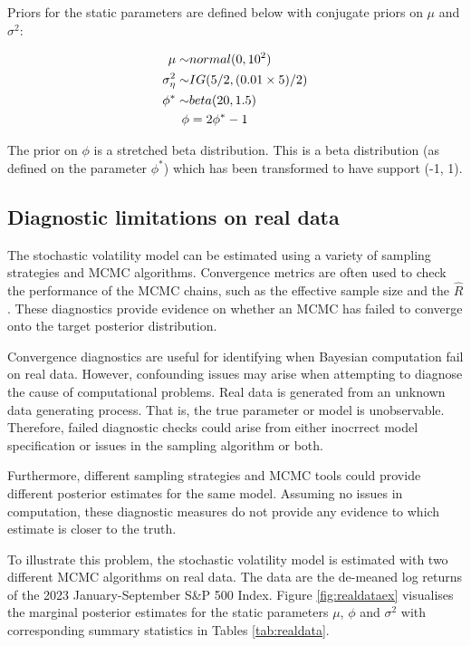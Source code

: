 \documentclass[12pt, a4paper]{article}
\begin{document}
    Priors for the static parameters are defined below with conjugate priors on $\mu$ and $\sigma^2$:

    $$
    \begin{aligned}
    \mu \sim& \space normal(0, 10^2) \\
    \sigma_{\eta}^2 \sim& \space IG(5/2, (0.01\times 5) / 2) \\
    \phi^{\ast} \sim& \space beta(20, 1.5) \\
    \phi &=  2\phi^{\ast} - 1
    \end{aligned}
    $$

    The prior on $\phi$ is a stretched beta distribution. This is a beta distribution (as defined on the parameter $\phi^*$) which has been transformed to have support (-1, 1).


\subsection{Diagnostic limitations on real data}
    The stochastic volatility model can be estimated using a variety of sampling strategies and MCMC algorithms. Convergence metrics are often used to check the performance of the MCMC chains, such as the effective sample size and the $\hat{R}$. These diagnostics provide evidence on whether an MCMC has failed to converge onto the target posterior distribution.

    Convergence diagnostics are useful for identifying when Bayesian computation fail on real data. However, confounding issues may arise when attempting to diagnose the cause of computational problems. Real data is generated from an unknown data generating process. That is, the true parameter or model is unobservable. Therefore, failed diagnostic checks could arise from either inocrrect model specification or issues in the sampling algorithm or both.

    Furthermore, different sampling strategies and MCMC tools could provide different posterior estimates for the same model. Assuming no issues in computation, these diagnostic measures do not provide any evidence to which estimate is closer to the truth.

    To illustrate this problem, the stochastic volatility model is estimated with two different MCMC algorithms on real data. The data are the de-meaned log returns of the 2023 January-September S\&P 500 Index. Figure \ref{fig:realdataex} visualises the marginal posterior estimates for the static parameters $\mu$, $\phi$ and $\sigma^2$ with corresponding summary statistics in Tables \ref{tab:realdata}.
\end{document}

